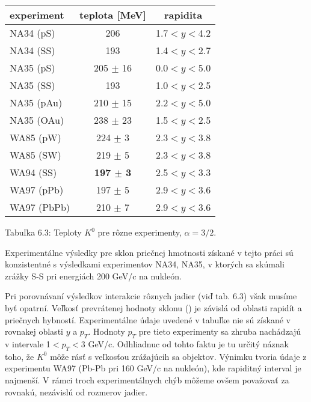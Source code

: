 \begin{center}
  \begin{tabular}{|l|c|c|}
    \hline
    experiment & teplota [MeV] & rapidita \\ \hline \hline
    NA34 (pS) & 206 & 1.7$<y<$4.2 \\
    NA34 (SS) & 193 & 1.4$<y<$2.7 \\
    NA35 (pS) & 205 $\pm$ 16 & 0.0$<y<$5.0 \\
    NA35 (SS) & 193 & 1.0$<y<$2.5 \\
    NA35 (pAu) & 210 $\pm$ 15 & 2.2$<y<$5.0 \\
    NA35 (OAu) & 238 $\pm$ 23 & 1.5$<y<$2.5 \\
    WA85 (pW) & 224 $\pm$ 3 & 2.3$<y<$3.8 \\
    WA85 (SW) & 219 $\pm$ 5 & 2.3$<y<$3.8 \\
    WA94 (SS) & {\bf 197 $\pm$ 3} & 2.5$<y<$3.3 \\
    WA97 (pPb) & 197 $\pm$ 5 & 2.9$<y<$3.6 \\
    WA97 (PbPb) & 210 $\pm$ 7 & 2.9$<y<$3.6 \\
    \hline
  \end{tabular}
\end{center}

\begin{center}
  Tabuľka 6.3: Teploty $K^{0}$ pre rôzne experimenty, $\alpha=3/2$.
\end{center}

Experimentálne výsledky pre sklon priečnej hmotnosti získané v tejto práci
sú konzistentné s výsledkami  experimentov NA34, NA35, v ktorých sa skúmali
zrážky S-S pri energiách 200 GeV/c na nukleón.

Pri porovnávaní výsledkov interakcie rôznych jadier (viď tab. 6.3)  však
musíme byť opatrní. Veľkosť  prevrátenej hodnoty sklonu () je
závislá od oblasti rapidít a priečnych hybností. Experimentálne údaje
uvedené v tabuľke nie sú získané v rovnakej oblasti $y$ a $p_{T}$.
Hodnoty $p_{T}$ pre tieto experimenty sa zhruba nachádzajú v intervale
1$<p_{T}<$3 GeV/c. Odhliadnuc od tohto faktu je tu určitý náznak toho, že
 $K^{0}$ môže rásť s veľkosťou zrážajúcih sa objektov. Výnimku
tvoria údaje z experimentu WA97 (Pb-Pb pri 160 GeV/c na nukleón), kde
rapiditný interval je najmenší. V rámci troch experimentálnych chýb môžeme
ovšem   považovať za rovnakú, nezávislú od rozmerov jadier.
%


